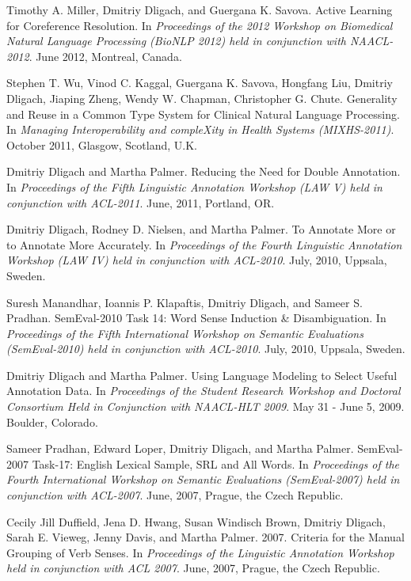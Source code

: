 \documentclass[letterpaper]{article}
\renewenvironment{itemize}{
  \begin{list}{}{
    \setlength{\leftmargin}{1.5em}
  }
}{
  \end{list}
}
\begin{document}
\begin{itemize}
\item Timothy A. Miller, Dmitriy Dligach, and Guergana K. Savova. Active Learning for Coreference Resolution. In \emph{Proceedings of the 2012 Workshop on Biomedical Natural Language Processing (BioNLP 2012) held in conjunction with NAACL-2012}. June 2012, Montreal, Canada.
\item Stephen T. Wu, Vinod C. Kaggal, Guergana K. Savova, Hongfang Liu, Dmitriy Dligach, Jiaping Zheng, Wendy W. Chapman, Christopher G. Chute. Generality and Reuse in a Common Type System for Clinical Natural Language Processing. In \emph{Managing Interoperability and compleXity in Health Systems (MIXHS-2011)}. October 2011, Glasgow, Scotland, U.K.
\item Dmitriy Dligach and Martha Palmer. Reducing the Need for Double Annotation. In \emph{Proceedings of the Fifth Linguistic Annotation Workshop (LAW V) held in conjunction with ACL-2011}. June, 2011, Portland, OR.
\item Dmitriy Dligach, Rodney D. Nielsen, and Martha Palmer. To Annotate More or to Annotate More Accurately. In \emph{Proceedings of the Fourth Linguistic Annotation Workshop (LAW IV) held in conjunction with ACL-2010}. July, 2010, Uppsala, Sweden.
\item Suresh Manandhar, Ioannis P. Klapaftis, Dmitriy Dligach, and Sameer S. Pradhan. SemEval-2010 Task 14: Word Sense Induction \& Disambiguation. In \emph{Proceedings of the Fifth International Workshop on Semantic Evaluations (SemEval-2010) held in conjunction with ACL-2010}. July, 2010, Uppsala, Sweden.
\item Dmitriy Dligach and Martha Palmer. Using Language Modeling to Select Useful Annotation Data. In \emph {Proceedings of the Student Research Workshop and Doctoral Consortium Held in Conjunction with NAACL-HLT 2009}. May 31 - June 5, 2009. Boulder, Colorado.
\item Sameer Pradhan, Edward Loper, Dmitriy Dligach, and Martha Palmer. SemEval-2007 Task-17: English Lexical Sample, SRL and All Words. In \emph {Proceedings of the Fourth International Workshop on Semantic Evaluations (SemEval-2007) held in conjunction with ACL-2007}. June, 2007, Prague, the Czech Republic.
\item Cecily Jill Duffield, Jena D. Hwang, Susan Windisch Brown, Dmitriy Dligach, Sarah E. Vieweg, Jenny Davis, and Martha Palmer. 2007. Criteria for the Manual Grouping of Verb Senses. In \emph {Proceedings of the Linguistic Annotation Workshop held in conjunction with ACL 2007}. June, 2007, Prague, the Czech Republic.
\end{itemize}
\end{document}
